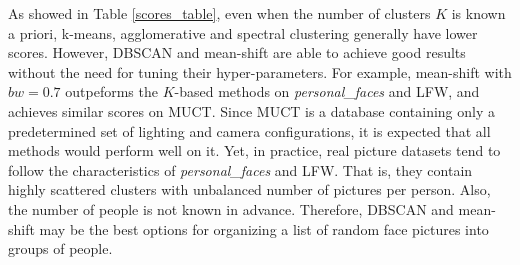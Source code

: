 \documentclass[conference]{IEEEtran}
\begin{document}
As showed in Table \ref{scores_table}, even when the number of clusters $K$ is known a priori, k-means, agglomerative and spectral clustering generally have lower scores.
However, DBSCAN and mean-shift are able to achieve good results without the need for tuning their hyper-parameters.
For example, mean-shift with $bw =0.7$ outpeforms the $K$-based methods on \textit{personal\_faces} and LFW, and achieves similar scores on MUCT.
Since MUCT is a database containing only a predetermined set of lighting and camera configurations, it is expected that all methods would perform well on it.
Yet, in practice, real picture datasets tend to follow the characteristics of \textit{personal\_faces} and LFW.
That is, they contain highly scattered clusters with unbalanced number of pictures per person.
Also, the number of people is not known in advance.
Therefore, DBSCAN and mean-shift may be the best options for organizing a list of random face pictures into groups of people.
\end{document}

